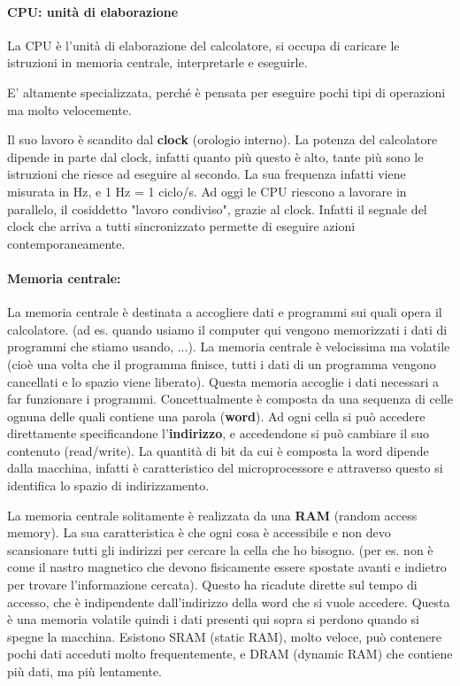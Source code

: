 \documentclass[
]{article}
\begin{document}
\hypertarget{header-n144}{%
\paragraph{CPU: unità di elaborazione}\label{header-n144}}

La CPU è l'unità di elaborazione del calcolatore, si occupa di caricare
le istruzioni in memoria centrale, interpretarle e eseguirle.

E' altamente specializzata, perché è pensata per eseguire pochi tipi di
operazioni ma molto velocemente.

Il suo lavoro è scandito dal \textbf{clock} (orologio interno). La
potenza del calcolatore dipende in parte dal clock, infatti quanto più
questo è alto, tante più sono le istruzioni che riesce ad eseguire al
secondo. La sua frequenza infatti viene misurata in Hz, e 1 Hz = 1
ciclo/s. Ad oggi le CPU riescono a lavorare in parallelo, il cosiddetto
"lavoro condiviso", grazie al clock. Infatti il segnale del clock che
arriva a tutti sincronizzato permette di eseguire azioni
contemporaneamente.

\hypertarget{header-n148}{%
\paragraph{Memoria centrale:}\label{header-n148}}

La memoria centrale è destinata a accogliere dati e programmi sui quali
opera il calcolatore. (ad es. quando usiamo il computer qui vengono
memorizzati i dati di programmi che stiamo usando, ...). La memoria
centrale è velocissima ma volatile (cioè una volta che il programma
finisce, tutti i dati di un programma vengono cancellati e lo spazio
viene liberato). Questa memoria accoglie i dati necessari a far
funzionare i programmi. Concettualmente è composta da una sequenza di
celle ognuna delle quali contiene una parola (\textbf{word}). Ad ogni
cella si può accedere direttamente specificandone l'\textbf{indirizzo},
e accedendone si può cambiare il suo contenuto (read/write). La quantità
di bit da cui è composta la word dipende dalla macchina, infatti è
caratteristico del microprocessore e attraverso questo si identifica lo
spazio di indirizzamento.

La memoria centrale solitamente è realizzata da una \textbf{RAM} (random
access memory). La sua caratteristica è che ogni cosa è accessibile e
non devo scansionare tutti gli indirizzi per cercare la cella che ho
bisogno. (per es. non è come il nastro magnetico che devono fisicamente
essere spostate avanti e indietro per trovare l'informazione cercata).
Questo ha ricadute dirette sul tempo di accesso, che è indipendente
dall'indirizzo della word che si vuole accedere. Questa è una memoria
volatile quindi i dati presenti qui sopra si perdono quando si spegne la
macchina. Esistono SRAM (static RAM), molto veloce, può contenere pochi
dati acceduti molto frequentemente, e DRAM (dynamic RAM) che contiene
più dati, ma più lentamente.
\end{document}
